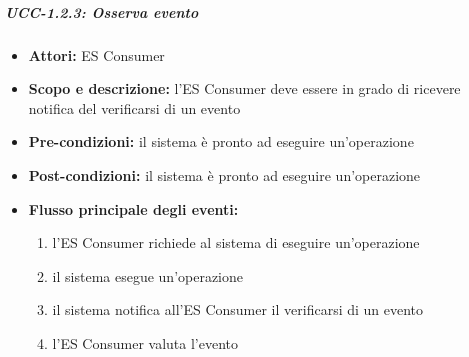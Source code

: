 \subparagraph{UCC-1.2.3: Osserva evento}

\begin{itemize}
	\item \textbf{Attori:} ES Consumer
	\item \textbf{Scopo e descrizione:} l'ES Consumer deve essere in grado di ricevere notifica del verificarsi di un evento
	\item \textbf{Pre-condizioni:} il sistema è pronto ad eseguire un'operazione
	\item \textbf{Post-condizioni:} il sistema è pronto ad eseguire un'operazione
	\item \textbf{Flusso principale degli eventi:}
		\begin{enumerate}
			\item l'ES Consumer richiede al sistema di eseguire un'operazione
			\item il sistema esegue un'operazione
			\item il sistema notifica all'ES Consumer il verificarsi di un evento
			\item l'ES Consumer valuta l'evento
		\end{enumerate}
\end{itemize}